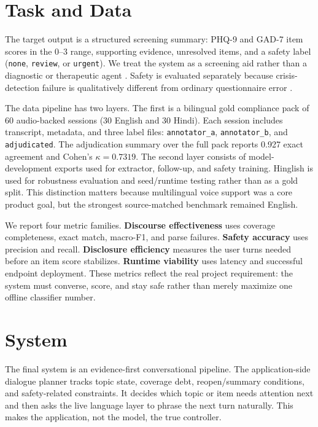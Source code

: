 \documentclass[11pt]{article}
\begin{document}
\section{Task and Data}
The target output is a structured screening summary: PHQ-9 and GAD-7 item scores in the 0--3 range, supporting evidence, unresolved items, and a safety label (\texttt{none}, \texttt{review}, or \texttt{urgent}). We treat the system as a screening aid rather than a diagnostic or therapeutic agent \citep{abd2020chatbots,dosovitsky2021chatbot}. Safety is evaluated separately because crisis-detection failure is qualitatively different from ordinary questionnaire error \citep{zirikly2019clpsych,pichowicz2025suicidal}.

The data pipeline has two layers. The first is a bilingual gold compliance pack of 60 audio-backed sessions (30 English and 30 Hindi). Each session includes transcript, metadata, and three label files: \texttt{annotator\_a}, \texttt{annotator\_b}, and \texttt{adjudicated}. The adjudication summary over the full pack reports 0.927 exact agreement and Cohen's $\kappa=0.7319$. The second layer consists of model-development exports used for extractor, follow-up, and safety training. Hinglish is used for robustness evaluation and seed/runtime testing rather than as a gold split. This distinction matters because multilingual voice support was a core product goal, but the strongest source-matched benchmark remained English.

We report four metric families. \textbf{Discourse effectiveness} uses coverage completeness, exact match, macro-F1, and parse failures. \textbf{Safety accuracy} uses precision and recall. \textbf{Disclosure efficiency} measures the user turns needed before an item score stabilizes. \textbf{Runtime viability} uses latency and successful endpoint deployment. These metrics reflect the real project requirement: the system must converse, score, and stay safe rather than merely maximize one offline classifier number.

\section{System}
The final system is an evidence-first conversational pipeline. The application-side dialogue planner tracks topic state, coverage debt, reopen/summary conditions, and safety-related constraints. It decides which topic or item needs attention next and then asks the live language layer to phrase the next turn naturally. This makes the application, not the model, the true controller.
\end{document}
